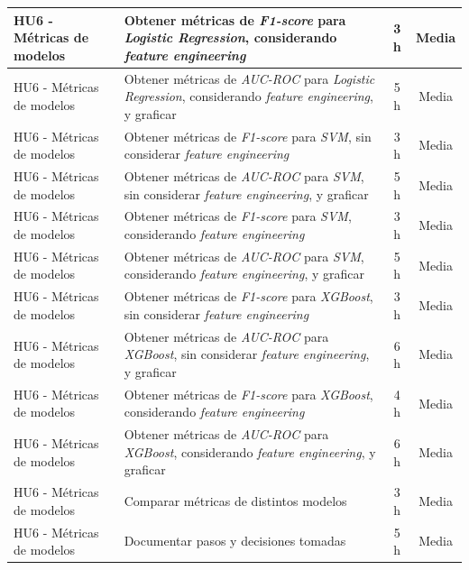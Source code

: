 \documentclass[
11pt, %
]{charter}
\begin{document}
\begin{xltabular}{\linewidth}{@{}|X|X|c|c|@{}}
HU6 - Métricas de modelos & Obtener métricas de \textit{F1-score} para \textit{Logistic Regression}, considerando \textit{feature engineering} & 3 h & Media \\ \hline
HU6 - Métricas de modelos & Obtener métricas de \textit{AUC-ROC} para \textit{Logistic Regression}, considerando \textit{feature engineering}, y graficar & 5 h & Media \\ \hline
HU6 - Métricas de modelos & Obtener métricas de \textit{F1-score} para \textit{SVM}, sin  considerar \textit{feature engineering} & 3 h & Media \\ \hline
HU6 - Métricas de modelos & Obtener métricas de \textit{AUC-ROC} para \textit{SVM}, sin  considerar \textit{feature engineering}, y graficar & 5 h & Media \\ \hline
HU6 - Métricas de modelos & Obtener métricas de \textit{F1-score} para \textit{SVM}, considerando \textit{feature engineering} & 3 h & Media \\ \hline
HU6 - Métricas de modelos & Obtener métricas de \textit{AUC-ROC} para \textit{SVM}, considerando \textit{feature engineering}, y graficar & 5 h & Media \\ \hline
HU6 - Métricas de modelos & Obtener métricas de \textit{F1-score} para \textit{XGBoost}, sin  considerar \textit{feature engineering} & 3 h & Media \\ \hline
HU6 - Métricas de modelos & Obtener métricas de \textit{AUC-ROC} para \textit{XGBoost}, sin  considerar \textit{feature engineering}, y graficar & 6 h & Media \\ \hline
HU6 - Métricas de modelos & Obtener métricas de \textit{F1-score} para \textit{XGBoost}, considerando \textit{feature engineering} & 4 h & Media \\ \hline
HU6 - Métricas de modelos & Obtener métricas de \textit{AUC-ROC} para \textit{XGBoost}, considerando \textit{feature engineering}, y graficar & 6 h & Media \\ \hline
HU6 - Métricas de modelos & Comparar métricas de distintos modelos & 3 h & Media \\ \hline
HU6 - Métricas de modelos & Documentar pasos y decisiones tomadas & 5 h & Media \\ \hline


\end{xltabular}
\end{document}
